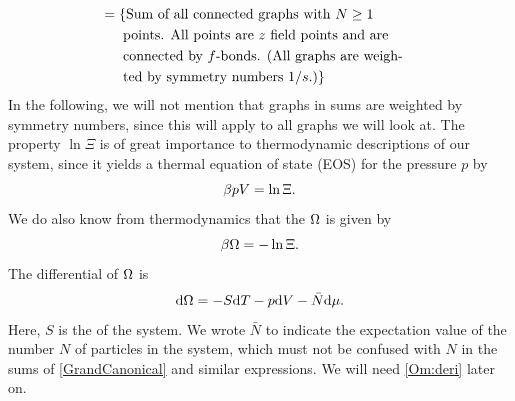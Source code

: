 \documentclass[8.5pt,twoside,twocolumn]{article}
\newcommand\di{\te{d}}
\theoremstyle{standard}
\begin{document}
\begin{equation}
\begin{aligned}
\\
&=\left\{\text{Sum of all connected graphs with } N \ge 1 \right. \\
&\left.\ \ \ \text{ points. All points are } z \text{ field points and are}\right. \\
&\left.\ \ \ \ \text{connected by }f\text{-bonds. (All graphs are weigh-}\right. \\
&\left.\ \ \ \ \text{ted by symmetry numbers 1/} s.) \right\}
\end{aligned}
\label{Grand:log}
\end{equation}  
In the following, we will not mention that graphs in sums are weighted by
symmetry numbers, since this will apply to all graphs we will look at. The
property $\ln \Xi$ is of great importance to thermodynamic descriptions of our
system, since it yields a thermal equation of state (EOS) for the pressure $p$
by
\begin{equation}
\beta p V = \ln \Xi.
\label{bpV}
\end{equation}
We do also know from thermodynamics that the 
$\Omega$ is given by
\begin{equation}
\beta \Omega = - \ln \Xi.
\label{Om:lnXi}
\end{equation}
The differential of $\Omega$ is
\begin{equation}
\di\Om = -S \di T - p \di V - \bar N \di \mu.
\label{Om:deri}
\end{equation}
Here, $S$ is the  of the system. We wrote $\bar N$ to indicate the
expectation value of the number $N$ of particles in the system, which must not
be confused with $N$ in the sums of \eqref{GrandCanonical} and similar expressions.
We will need \eqref{Om:deri} later on.
\end{document}
